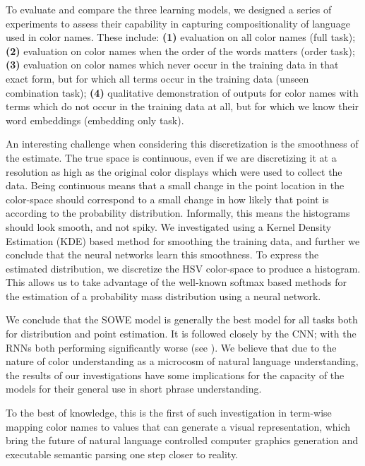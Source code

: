 \documentclass[]{clv3}
\newcommand{\parencite}{\citep}
\newcommand{\datapairs}{$\langle\text{color-name},\,(h,s,v)\rangle$}
\begin{document}
To evaluate and compare the three learning models, we designed a series of experiments to assess their capability in capturing compositionality of language used in color names.
These include:
\textbf{(1)} evaluation on all color names (full task);
\textbf{(2)} evaluation on  color names when the order of the words matters (order task);
\textbf{(3)} evaluation on color names which never occur in the training data in that exact form, but for which all terms occur in the training data (unseen combination task);
\textbf{(4)} qualitative demonstration of outputs for color names with terms which do not occur in the training data at all, but for which we know their word embeddings (embedding only task).

An interesting challenge when considering this discretization is the smoothness of the estimate.
The true space is continuous, even if we are discretizing it at a resolution as high as the original color displays which were used to collect the data.
Being continuous means that a small change in the point location in the color-space should correspond to a small change in how likely that point is according to the probability distribution.
Informally, this means the histograms should look smooth, and not spiky.
We investigated using a Kernel Density Estimation (KDE) based method for smoothing the training data, and further we conclude that the neural networks learn this smoothness.
To express the estimated distribution, we discretize the HSV color-space to produce a histogram.
This allows us to take advantage of the well-known softmax based methods for the estimation of a probability mass distribution using a neural network.


We conclude that the SOWE model is generally the best model for all tasks both for distribution and point estimation.
It is followed closely by the CNN; with the RNNs both performing significantly worse (see ).
We believe that due to the nature of color understanding as a microcosm of natural language understanding, the results of our investigations have some implications for the capacity of the models for their general use in short phrase understanding.

To the best of knowledge, this is the first of such investigation in term-wise mapping color names to values that can generate a visual representation, which bring the future of natural language controlled computer graphics generation and executable semantic parsing one step closer to reality.  
\end{document}
